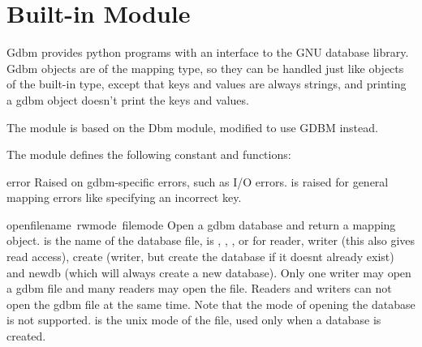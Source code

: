 \section{Built-in Module }

Gdbm provides python programs with an interface to the GNU 
database library.  Gdbm objects are of the mapping type, so they can be
handled just like objects of the built-in  type,
except that keys and values are always strings, and printing a gdbm
object doesn't print the keys and values.

The module is based on the Dbm module, modified to use GDBM instead.

The module defines the following constant and functions:

\renewcommand{\indexsubitem}{(in module gdbm)}
\begin{excdesc}{error}
Raised on gdbm-specific errors, such as I/O errors.  is
raised for general mapping errors like specifying an incorrect key.
\end{excdesc}

\begin{funcdesc}{open}{filename\, rwmode\, filemode}
Open a gdbm database and return a mapping object.  is
the name of the database file,  is , ,
, or  for reader, writer (this also gives read
access), create (writer, but create the database if it doesnt already
exist) and newdb (which will always create a new database). Only one
writer may open a gdbm file and many readers may open the file. Readers
and writers can not open the gdbm file at the same time. Note that the
 mode of opening the database is not supported.  
is the unix mode of the file, used only when a database is created.
\end{funcdesc}

